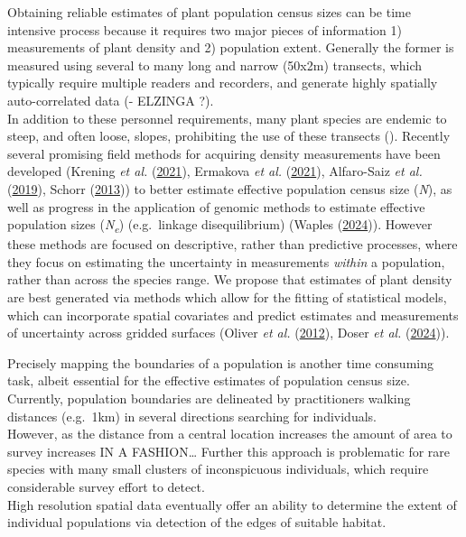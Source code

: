 \documentclass[
]{article}
\begin{document}
Obtaining reliable estimates of plant population census sizes can be
time intensive process because it requires two major pieces of
information 1) measurements of plant density and 2) population extent.
Generally the former is measured using several to many long and narrow
(50x2m) transects, which typically require multiple readers and
recorders, and generate highly spatially auto-correlated data (- ELZINGA
?).\\
In addition to these personnel requirements, many plant species are
endemic to steep, and often loose, slopes, prohibiting the use of these
transects (). Recently several promising field methods for acquiring
density measurements have been developed (Krening \emph{et al.}
(\protect\hyperlink{ref-krening2021sampling}{2021}), Ermakova \emph{et
al.} (\protect\hyperlink{ref-ermakova2021densities}{2021}), Alfaro-Saiz
\emph{et al.} (\protect\hyperlink{ref-alfaro2019optimal}{2019}), Schorr
(\protect\hyperlink{ref-schorr2013using}{2013})) to better estimate
effective population census size (\emph{N}), as well as progress in the
application of genomic methods to estimate effective population sizes
(\emph{N\textsubscript{e}}) (e.g.~linkage disequilibrium) (Waples
(\protect\hyperlink{ref-waples2024practical}{2024})). However these
methods are focused on descriptive, rather than predictive processes,
where they focus on estimating the uncertainty in measurements
\emph{within} a population, rather than across the species range. We
propose that estimates of plant density are best generated via methods
which allow for the fitting of statistical models, which can incorporate
spatial covariates and predict estimates and measurements of uncertainty
across gridded surfaces (Oliver \emph{et al.}
(\protect\hyperlink{ref-oliver2012population}{2012}), Doser \emph{et
al.} (\protect\hyperlink{ref-doser2022spabundance}{2024})).

Precisely mapping the boundaries of a population is another time
consuming task, albeit essential for the effective estimates of
population census size. Currently, population boundaries are delineated
by practitioners walking distances (e.g.~1km) in several directions
searching for individuals.\\
However, as the distance from a central location increases the amount of
area to survey increases IN A FASHION\ldots{} Further this approach is
problematic for rare species with many small clusters of inconspicuous
individuals, which require considerable survey effort to detect.\\
High resolution spatial data eventually offer an ability to determine
the extent of individual populations via detection of the edges of
suitable habitat.
\end{document}
